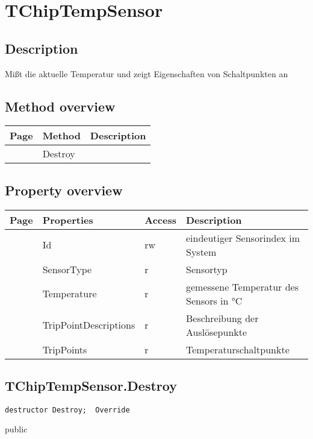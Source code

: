 \section{TChipTempSensor}
\label{computer:chiptemp:tchiptempsensor}
\subsection{Description}
Mißt die aktuelle Temperatur und zeigt Eigenschaften von Schaltpunkten an%
\subsection{Method overview}
\label{computer:chiptemp:tchiptempsensor:methods}
\begin{tabularx}{\textwidth}{llX}
Page & Method & Description  \\ \hline
\pageref{computer:chiptemp:tchiptempsensor:destroy} & Destroy  &  \\
\hline
\end{tabularx}
\subsection{Property overview}
\label{computer:chiptemp:tchiptempsensor:properties}
\begin{tabularx}{\textwidth}{lllX}
Page & Properties & Access & Description \\ \hline
\pageref{computer:chiptemp:tchiptempsensor:id} & Id & rw & eindeutiger Sensorindex im System \\
\pageref{computer:chiptemp:tchiptempsensor:sensortype} & SensorType & r & Sensortyp \\
\pageref{computer:chiptemp:tchiptempsensor:temperature} & Temperature & r & gemessene Temperatur des Sensors in °C \\
\pageref{computer:chiptemp:tchiptempsensor:trippointdescriptions} & TripPointDescriptions & r & Beschreibung der Auslösepunkte \\
\pageref{computer:chiptemp:tchiptempsensor:trippoints} & TripPoints & r & Temperaturschaltpunkte \\
\hline
\end{tabularx}
\subsection{TChipTempSensor.Destroy}
\label{computer:chiptemp:tchiptempsensor:destroy}
\begin{FPCList}
\Declaration 

\begin{verbatim}
destructor Destroy;  Override
\end{verbatim}
\Visibility
public
\end{FPCList}
